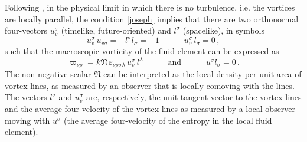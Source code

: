 \documentclass[preprints,article,accept,moreauthors,pdftex]{mdpi}
\newcommand{\spc}{\quad \quad \quad}
\begin{document}
Following \citep{Carter_defects2000}, in the physical limit in which there is no turbulence, i.e. the vortices are locally parallel, the condition \eqref{joseph} implies that there are two orthonormal four-vectors $u_v^\sigma$ (timelike, future-oriented) and  $l^\sigma$ (spacelike), in symbols
\begin{equation}\label{condizio}
u_v^\sigma \, u_{v\sigma} = -l^\sigma l_\sigma =-1  \spc u_v^\sigma \, l_\sigma =0 \, ,  
\end{equation} 
such that the macroscopic vorticity of the fluid element can be expressed as
\begin{equation}\label{explixit}
\varpi_{\nu \rho} = k \mathfrak{N} \, \varepsilon_{\nu \rho \sigma \lambda} \, u_v^\sigma \, l^\lambda  \spc \text{and} \spc u^\sigma l_\sigma =0 \, .
\end{equation}
The non-negative scalar $\mathfrak{N}$ can be interpreted as the local density per unit area of vortex lines, as measured by an observer that is locally comoving with the lines. 
The vectors $l^\sigma$ and $u_v^\sigma$ are, respectively, the unit tangent vector to the vortex lines and the average four-velocity of the vortex lines as measured by a local observer moving with $u^\sigma$ (the average four-velocity of the entropy in the local fluid element).
\end{document}
